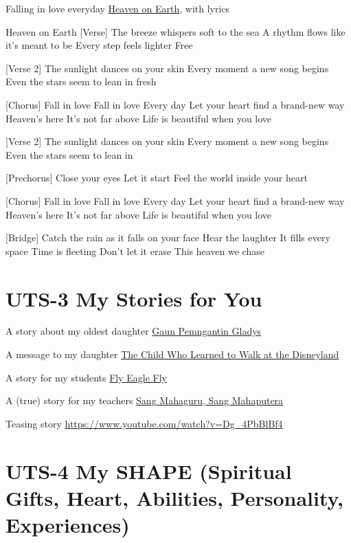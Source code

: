 \documentclass[
  letterpaper,
  DIV=11,
  numbers=noendperiod]{scrreprt}
\begin{document}
Falling in love everyday \href{./Heaven\%20on\%20Earth.mp3}{Heaven on
Earth}, with lyrics

Heaven on Earth {[}Verse{]} The breeze whispers soft to the sea A rhythm
flows like it's meant to be Every step feels lighter Free

{[}Verse 2{]} The sunlight dances on your skin Every moment a new song
begins Even the stars seem to lean in fresh

{[}Chorus{]} Fall in love Fall in love Every day Let your heart find a
brand-new way Heaven's here It's not far above Life is beautiful when
you love

{[}Verse 2{]} The sunlight dances on your skin Every moment a new song
begins Even the stars seem to lean in

{[}Prechorus{]} Close your eyes Let it start Feel the world inside your
heart

{[}Chorus{]} Fall in love Fall in love Every day Let your heart find a
brand-new way Heaven's here It's not far above Life is beautiful when
you love

{[}Bridge{]} Catch the rain as it falls on your face Hear the laughter
It fills every space Time is fleeting Don't let it erase This heaven we
chase


\chapter{UTS-3 My Stories for You}\label{uts-3-my-stories-for-you}

A story about my oldest daughter
\href{https://azrl.wordpress.com/2020/07/18/gaun-pengantin-gladys/\#comment-28004}{Gaun
Pemngantin Gladys}

A message to my daughter
\href{https://azrl.wordpress.com/2021/10/06/the-child-who-learned-to-walk-at-the-disneyland/}{The
Child Who Learned to Walk at the Disneyland}

A story for my students
\href{https://azrl.wordpress.com/2008/04/21/fly-my-eagle-fly/}{Fly Eagle
Fly}

A (true) story for my teachers
\href{\%3Chttps://azrl.wordpress.com/2012/11/28/perginya-sang-mahaputera-dan-mahaguru-berkemeja-putih/}{Sang
Mahaguru, Sang Mahaputera}

Teasing story \url{https://www.youtube.com/watch?v=Dg_4PbBlBf4}


\chapter{UTS-4 My SHAPE (Spiritual Gifts, Heart, Abilities, Personality,
Experiences)}\label{uts-4-my-shape-spiritual-gifts-heart-abilities-personality-experiences}
\end{document}

